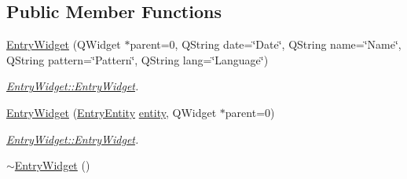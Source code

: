 \subsection*{Public Member Functions}
\begin{DoxyCompactItemize}
\item 
\hyperlink{class_entry_widget_aa779077fc090b2cec2b00c57a1083249}{Entry\+Widget} (Q\+Widget $\ast$parent=0, Q\+String date=\char`\"{}Date\char`\"{}, Q\+String name=\char`\"{}Name\char`\"{}, Q\+String pattern=\char`\"{}Pattern\char`\"{}, Q\+String lang=\char`\"{}Language\char`\"{})
\begin{DoxyCompactList}\small\item\em \hyperlink{class_entry_widget_aa779077fc090b2cec2b00c57a1083249}{Entry\+Widget\+::\+Entry\+Widget}. \end{DoxyCompactList}\item 
\hyperlink{class_entry_widget_a2096efb71a593ce906aca0b5b5f811d9}{Entry\+Widget} (\hyperlink{class_entry_entity}{Entry\+Entity} \hyperlink{class_entry_widget_af215e0236b2829209fc5959185e4e294}{entity}, Q\+Widget $\ast$parent=0)
\begin{DoxyCompactList}\small\item\em \hyperlink{class_entry_widget_aa779077fc090b2cec2b00c57a1083249}{Entry\+Widget\+::\+Entry\+Widget}. \end{DoxyCompactList}\item 
\hyperlink{class_entry_widget_a4a57cbfd7b08172aee033860e32e0b56}{$\sim$\+Entry\+Widget} ()
\end{DoxyCompactItemize}
